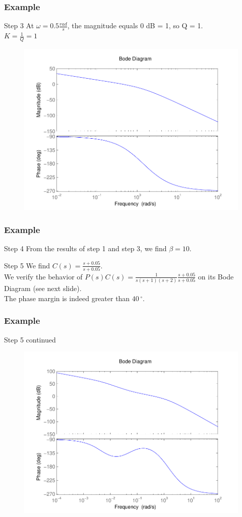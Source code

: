 \begin{frame}
\frametitle{Example}
\begin{block}{Step 3}
At $\omega = 0.5 \frac{rad}{s}$, the magnitude equals 0 dB = 1, so Q = 1. \\
$K = \frac{1}{Q} = 1$
\begin{figure}
	\centering
	\includegraphics[width=0.5
	\linewidth]{bodeexamplelag}
\end{figure}
\end{block}
\end{frame}

\begin{frame}
\frametitle{Example}
\begin{block}{Step 4}
From the results of step 1 and step 3, we find $\beta = 10$.
\end{block}
\begin{block}{Step 5}
We find $C(s) = \frac{s + 0.05}{s + 0.05}$. \\ We verify the behavior of $P(s)C(s) = \frac{1}{s(s+1)(s+2)}\frac{s + 0.05}{s + 0.05}$ on its Bode Diagram (see next slide). \\
The phase margin is indeed greater than $40\,^{\circ}$.
\end{block}
\end{frame}

\begin{frame}
\frametitle{Example}
\begin{block}{Step 5 continued}
\begin{figure}
	\centering
	\includegraphics[width=0.5
	\linewidth]{bodeexamplelagstep5}
\end{figure}
\end{block}
\end{frame}

